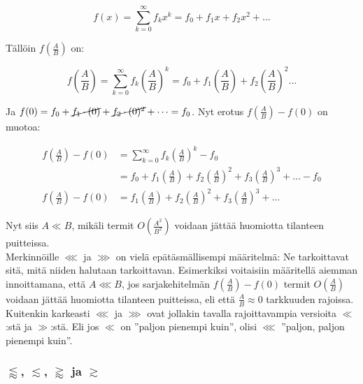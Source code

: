 \documentclass[../johdoksia.tex]{subfiles}
\begin{document}
	\begin{equation*}
		f(x) = \sum_{k = 0}^{\infty}f_kx^k = f_0 + f_1x + f_2x^2 + \dots
	\end{equation*}

	Tällöin $f\left(\frac{A}{B}\right)$ on:
	
	\begin{equation*}
		f\left(\frac{A}{B}\right) = \sum_{k = 0}^{\infty}f_k\left(\frac{A}{B}\right)^k = f_0 + f_1\left(\frac{A}{B}\right) + f_2\left(\frac{A}{B}\right)^2 \dots
	\end{equation*}

	Ja $f(0) = f_0 + \cancel{f_1\cdot(0)} + \cancel{f_2\cdot(0)^2} + \dots = f_0$. Nyt erotus $f\left(\frac{A}{B}\right) - f(0)$ on muotoa:
	
	\begin{align*}
		f\left(\frac{A}{B}\right) - f(0) &= \sum_{k = 0}^{\infty}f_k\left(\frac{A}{B}\right)^k - f_0 \\
		&= f_0 + f_1\left(\frac{A}{B}\right) + f_2\left(\frac{A}{B}\right)^2 + f_3\left(\frac{A}{B}\right)^3 + \dots - f_0 \\
		f\left(\frac{A}{B}\right) - f(0) &= f_1\left(\frac{A}{B}\right) + f_2\left(\frac{A}{B}\right)^2 + f_3\left(\frac{A}{B}\right)^3 + \dots
	\end{align*}

	Nyt siis $A \ll B$, mikäli termit $O\left(\frac{A^2}{B^2}\right)$ voidaan jättää huomiotta tilanteen puitteissa. \\
	
	\noindent Merkinnöille $\lll$ ja $\ggg$ on vielä epätäsmällisempi määritelmä: Ne tarkoittavat sitä, mitä niiden halutaan tarkoittavan. Esimerkiksi voitaisiin määritellä aiemman innoittamana, että $A \lll B$, jos sarjakehitelmän $f\left(\frac{A}{B}\right) - f(0)$ termit $O\left(\frac{A}{B}\right)$ voidaan jättää huomiotta tilanteen puitteissa, eli että $\frac{A}{B} \approx 0$ tarkkuuden rajoissa. Kuitenkin karkeasti $\lll$ ja $\ggg$ ovat jollakin tavalla rajoittavampia versioita $\ll$:stä ja $\gg$:stä. Eli jos $\ll$ on ''paljon pienempi kuin'', olisi $\lll$ ''paljon, paljon pienempi kuin''.
	
	\subsubsection{$\lessapprox$, $\lesssim$, $\gtrapprox$ ja $\gtrsim$}
	
\end{document}
